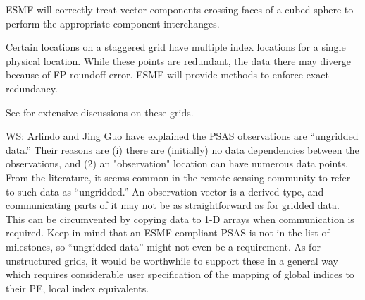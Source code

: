 
ESMF will correctly treat vector components crossing faces of a cubed
sphere to perform the appropriate component interchanges.


Certain locations on a staggered grid have multiple index locations
for a single physical location. While these points are redundant, the
data there may diverge because of FP roundoff error. ESMF will provide
methods to enforce exact redundancy.




See \cite{art:heikes+:geodesic,art:majewski+:gme} for extensive
discussions on these grids.




WS: Arlindo and Jing Guo have explained the PSAS
observations are ``ungridded data.'' Their reasons are (i) there are
(initially) no data dependencies between the observations, and (2) an
"observation" location can have numerous data points.  From the
literature, it seems common in the remote sensing community to refer
to such data as ``ungridded.''  An observation vector is a derived
type, and communicating parts of it may not be as straightforward as for
gridded data.  This can be circumvented by copying data to 1-D arrays
when communication is required.  Keep in mind that an ESMF-compliant
PSAS is not in the list of milestones, so ``ungridded data'' might not
even be a requirement.  As for unstructured grids, it would be
worthwhile to support these in a general way which requires
considerable user specification of the mapping of global indices to
their PE, local index equivalents.


